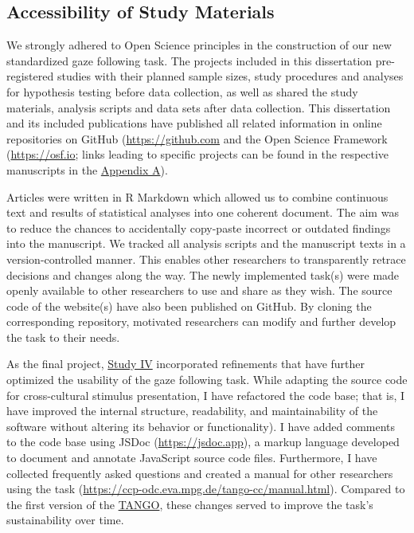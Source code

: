 \documentclass[
]{scrbook}
\begin{document}
\subsection{Accessibility of Study Materials}\label{accesibility}

We strongly adhered to Open Science principles in the construction of our new standardized gaze following task. The projects included in this dissertation pre-registered studies with their planned sample sizes, study procedures and analyses for hypothesis testing before data collection, as well as shared the study materials, analysis scripts and data sets after data collection. This dissertation and its included publications have published all related information in online repositories on GitHub (\mbox{\url{https://github.com}} and the Open Science Framework (\mbox{\url{https://osf.io}}; links leading to specific projects can be found in the respective manuscripts in the \hyperref[appendixA]{Appendix A}).

Articles were written in R Markdown which allowed us to combine continuous text and results of statistical analyses into one coherent document. The aim was to reduce the chances to accidentally copy-paste incorrect or outdated findings into the manuscript. We tracked all analysis scripts and the manuscript texts in a version-controlled manner. This enables other researchers to transparently retrace decisions and changes along the way. The newly implemented task(s) were made openly available to other researchers to use and share as they wish. The source code of the website(s) have also been published on GitHub. By cloning the corresponding repository, motivated researchers can modify and further develop the task to their needs.

As the final project, \hyperref[studyIV]{Study IV} incorporated refinements that have further optimized the usability of the gaze following task. While adapting the source code for cross-cultural stimulus presentation, I have refactored the code base; that is, I have improved the internal structure, readability, and maintainability of the software without altering its behavior or functionality). I have added comments to the code base using JSDoc (\mbox{\url{https://jsdoc.app}}), a markup language developed to document and annotate JavaScript source code files. Furthermore, I have collected frequently asked questions and created a manual for other researchers using the task (\mbox{\url{https://ccp-odc.eva.mpg.de/tango-cc/manual.html}}). Compared to the first version of the \hyperref[acronyms_TANGO]{TANGO}, these changes served to improve the task's sustainability over time.
\end{document}
